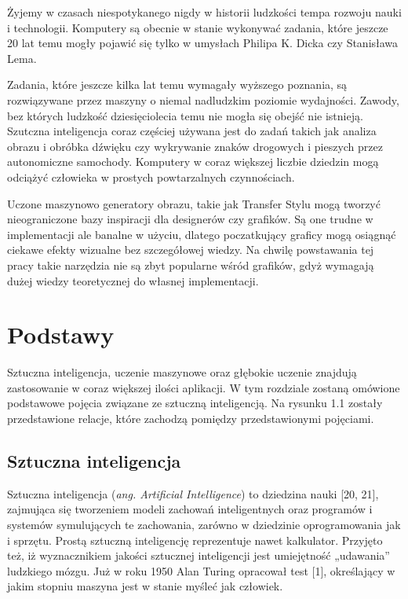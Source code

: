 \documentclass[openright]{xmgr}
\begin{document}
\introduction

\indent \indent Żyjemy w czasach niespotykanego nigdy w historii ludzkości tempa rozwoju nauki i technologii. Komputery są obecnie w stanie wykonywać zadania, które jeszcze 20 lat temu mogły pojawić się tylko w umysłach Philipa K. Dicka czy Stanisława Lema.

Zadania, które jeszcze kilka lat temu wymagały wyższego poznania, są rozwiązywane przez maszyny o niemal nadludzkim poziomie wydajności. Zawody, bez których ludzkość dziesięciolecia temu nie mogła się obejść nie istnieją. Szutczna inteligencja coraz częściej używana jest do zadań takich jak analiza obrazu i obróbka dźwięku czy wykrywanie znaków drogowych i pieszych przez autonomiczne samochody. Komputery w coraz większej liczbie dziedzin mogą odciążyć człowieka w prostych powtarzalnych czynnościach.

 Uczone maszynowo generatory obrazu, takie jak Transfer Stylu mogą tworzyć nieograniczone bazy inspiracji dla designerów czy grafików. Są one trudne w implementacji ale banalne w użyciu, dlatego poczatkujący graficy mogą osiągnąć ciekawe efekty wizualne bez szczegółowej wiedzy.  Na chwilę powstawania tej pracy takie narzędzia nie są zbyt popularne wśród grafików,  gdyż wymagają dużej wiedzy teoretycznej do własnej implementacji. 


\chapter{Podstawy\label{s:dtd}}

\indent \indent Sztuczna inteligencja, uczenie maszynowe oraz głębokie uczenie znajdują zastosowanie w coraz większej ilości aplikacji. W tym rozdziale zostaną omówione podstawowe pojęcia związane ze sztuczną inteligencją. Na rysunku 1.1 zostały przedstawione relacje, które zachodzą pomiędzy przedstawionymi pojęciami.

\section{Sztuczna inteligencja}

\indent \indent Sztuczna inteligencja (\textit{ang. Artificial Intelligence}) to dziedzina nauki [20, 21], zajmująca się tworzeniem modeli zachowań inteligentnych oraz programów i systemów symulujących te zachowania, zarówno w dziedzinie oprogramowania jak i sprzętu. Prostą sztuczną inteligencję reprezentuje nawet kalkulator. Przyjęto też, iż wyznacznikiem jakości sztucznej inteligencji jest umiejętność „udawania” ludzkiego mózgu. Już w roku 1950 Alan Turing opracował test [1], określający w jakim stopniu maszyna jest w stanie myśleć jak człowiek.
\end{document}
